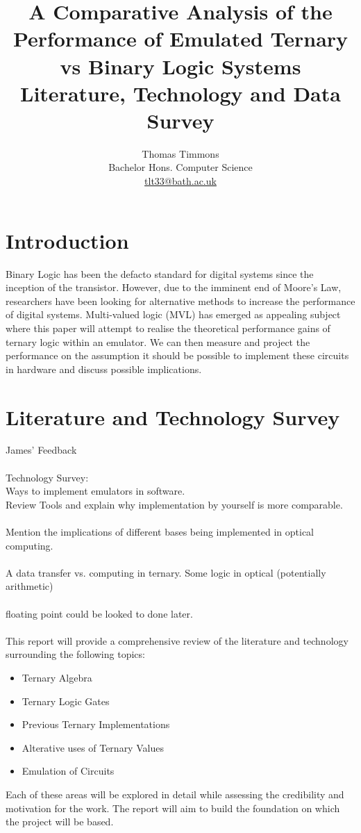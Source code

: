 \documentclass[12pt]{article}
\title{\textbf{A Comparative Analysis of the Performance of Emulated Ternary vs Binary Logic Systems} \\ [1ex] \large Literature, Technology and Data Survey}
\author{
    Thomas Timmons\\
    Bachelor Hons. Computer Science\\
    \href{mailto:tlt33@bath.ac.uk}{tlt33@bath.ac.uk}
}
\begin{document}
\maketitle

\section{Introduction}

Binary Logic has been the defacto standard for digital systems since the inception of the transistor. However, due to the 
imminent end of Moore's Law, researchers have been looking for alternative methods to increase the performance of digital
systems. Multi-valued logic (MVL) has emerged as appealing subject where this paper will attempt to realise the theoretical 
performance gains of ternary logic within an emulator. We can then measure and project the performance on the assumption 
it should be possible to implement these circuits in hardware and discuss possible implications.

\section{Literature and Technology Survey}

James' Feedback\\
\\
Technology Survey:\\
Ways to implement emulators in software.\\
Review Tools and explain why implementation by yourself is 
more comparable.\\
\\
Mention the implications of different bases being implemented 
in optical computing.\\
\\
A data transfer vs. computing in ternary. Some logic in optical 
(potentially arithmetic)\\
\\
floating point could be looked to done later.\\
\\
This report will provide a comprehensive review of the literature and technology surrounding the following topics:
\begin{itemize}
    \item Ternary Algebra
    \item Ternary Logic Gates
    \item Previous Ternary Implementations
    \item Alterative uses of Ternary Values
    \item Emulation of Circuits
\end{itemize}
Each of these areas will be explored in detail while assessing the credibility and motivation for the work. The report will 
aim to build the foundation on which the project will be based.\\
\end{document}
